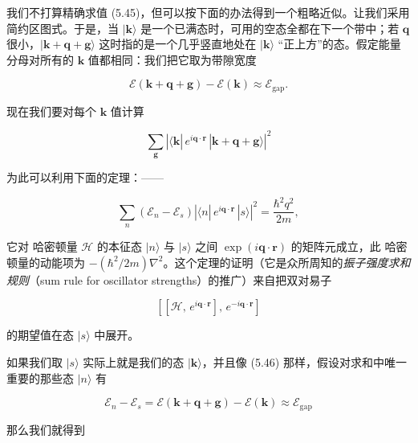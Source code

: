 我们不打算精确求值 (5.45)，但可以按下面的办法得到一个粗略近似。让我们采用简约区图式。于是，当 $|\mathbf{k}\rangle$ 是一个已满态时，可用的空态全都在下一个带中；若 $\mathbf{q}$ 很小，$|\mathbf{k}+\mathbf{q}+\mathbf{g}\rangle$ 这时指的是一个几乎竖直地处在 $|\mathbf{k}\rangle$ “正上方”的态。假定能量分母对所有的 $\mathbf{k}$ 值都相同：我们把它取为带隙宽度

\begin{equation*}
\mathcal{E}(\mathbf{k}+\mathbf{q}+\mathbf{g}) - \mathcal{E}(\mathbf{k}) \approx \mathcal{E}_{\mathrm{gap}} .
\tag{5.46}
\end{equation*}

现在我们要对每个 $\mathbf{k}$ 值计算

\begin{equation*}
\sum_{\mathbf{g}} \left| \langle \mathbf{k}|\, e^{i\mathbf{q}\cdot\mathbf{r}}\, |\mathbf{k}+\mathbf{q}+\mathbf{g}\rangle \right|^2
\tag{5.47}
\end{equation*}

为此可以利用下面的定理：——

\begin{equation*}
\sum_n \left( \mathcal{E}_n - \mathcal{E}_s \right) \left| \langle n|\, e^{i\mathbf{q}\cdot\mathbf{r}}\, |s\rangle \right|^2 = \frac{\hbar^2 q^2}{2m},
\tag{5.48}
\end{equation*}

它对 哈密顿量 $\mathcal{H}$ 的本征态 $|n\rangle$ 与 $|s\rangle$ 之间 $\exp(i\mathbf{q}\cdot\mathbf{r})$ 的矩阵元成立，此 哈密顿量的动能项为 $-(\hbar^2/2m)\nabla^2$。这个定理的证明（它是众所周知的\emph{振子强度求和规则}（sum rule for oscillator strengths）的推广）来自把双对易子

\begin{equation*}
\left[ \left[ \mathcal{H},\, e^{i\mathbf{q}\cdot\mathbf{r}} \right],\, e^{-i\mathbf{q}\cdot\mathbf{r}} \right]
\tag{5.49}
\end{equation*}

的期望值在态 $|s\rangle$ 中展开。

如果我们取 $|s\rangle$ 实际上就是我们的态 $|\mathbf{k}\rangle$，并且像 (5.46) 那样，假设对求和中唯一重要的那些态 $|n\rangle$ 有

\begin{equation*}
\mathcal{E}_n - \mathcal{E}_s = \mathcal{E}(\mathbf{k}+\mathbf{q}+\mathbf{g}) - \mathcal{E}(\mathbf{k}) \approx \mathcal{E}_{\mathrm{gap}}
\tag{5.50}
\end{equation*}

那么我们就得到

